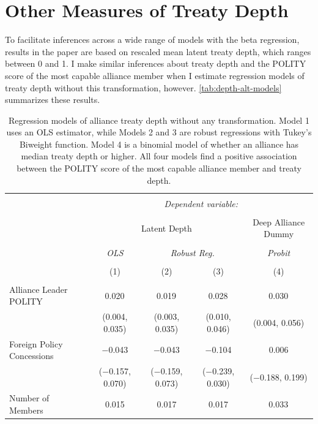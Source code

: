 \documentclass[12pt]{article}
\begin{document}
\section{Other Measures of Treaty Depth}


To facilitate inferences across a wide range of models with the beta regression, results in the paper are based on rescaled mean latent treaty depth, which ranges between 0 and 1. 
I make similar inferences about treaty depth and the POLITY score of the most capable alliance member when I estimate regression models of treaty depth without this transformation, however. 
\autoref{tab:depth-alt-models} summarizes these results. 

\begin{table}[!htbp] 
\centering 
  \caption{Regression models of alliance treaty depth without any transformation. Model 1 uses an OLS estimator, while Models 2 and 3 are robust regressions with Tukey's Biweight function. Model 4 is a binomial model of whether an alliance has median treaty depth or higher. All four models find a positive association between the POLITY score of the most capable alliance member and treaty depth.} 
  \label{tab:depth-alt-models} 
\begin{adjustbox}{width= .95\textwidth, center}
\begin{tabular}{@{\extracolsep{5pt}}lcccc} 
\\[-1.8ex]\hline 
\hline \\[-1.8ex] 
 & \multicolumn{4}{c}{\textit{Dependent variable:}} \\ 
\cline{2-5} 
\\[-1.8ex] & \multicolumn{3}{c}{Latent Depth} & Deep Alliance Dummy \\ 
\\[-1.8ex] & \textit{OLS} & \multicolumn{2}{c}{\textit{Robust Reg.}} & \textit{Probit} \\ 
\\[-1.8ex] & (1) & (2) & (3) & (4)\\ 
\hline \\[-1.8ex] 
 Alliance Leader POLITY & 0.020$^{}$ & 0.019$^{}$ & 0.028$^{}$ & 0.030$^{}$ \\ 
  & (0.004, 0.035) & (0.003, 0.035) & (0.010, 0.046) & (0.004, 0.056) \\ 
  Foreign Policy Concessions & $-$0.043 & $-$0.043 & $-$0.104 & 0.006 \\ 
  & ($-$0.157, 0.070) & ($-$0.159, 0.073) & ($-$0.239, 0.030) & ($-$0.188, 0.199) \\ 
  Number of Members & 0.015 & 0.017 & 0.017 & 0.033$^{}$ \\ 

\end{tabular}
\end{adjustbox}
\end{table}
\end{document}
